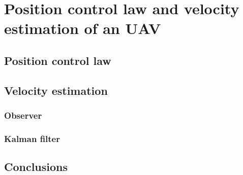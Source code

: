 \chapter{Position control law and velocity estimation of an UAV}

\ifpdf
    \graphicspath{{Chapter3/Figs/Raster/}{Chapter3/Figs/PDF/}{Chapter3/Figs/}}
\else
    \graphicspath{{Chapter3/Figs/Vector/}{Chapter3/Figs/}}
\fi
%
%
\section{Position control law}

\section{Velocity estimation}
\subsection{Observer}
\subsection{Kalman filter}


\section{Conclusions}





